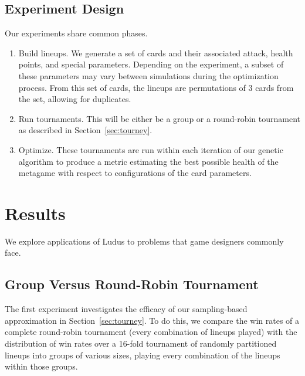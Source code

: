 \documentclass[letterpaper]{article} %
\begin{document}
\subsection{Experiment Design}


Our experiments share common phases.

\begin{enumerate}
	\item Build lineups. We generate a set of cards and their associated attack, health points, and special parameters.
	Depending on the experiment, a subset of these parameters may vary between simulations during the optimization process.
	From this set of cards, the lineups are permutations of 3 cards from the set, allowing for duplicates.
	\item Run tournaments. This will be either be a group or a round-robin tournament as described in Section~\ref{sec:tourney}.
	\item Optimize. These tournaments are run within each iteration of our genetic algorithm to produce a metric estimating the best
	possible health of the metagame with respect to configurations of the card parameters. %
\end{enumerate}

\section{Results} \label{sec:results}
We explore applications of {\sc Ludus} to problems that game designers commonly face.

\subsection{Group Versus Round-Robin Tournament}

The first experiment %
investigates the efficacy of our sampling-based approximation in Section~\ref{sec:tourney}. To do this, we compare the win rates %
of a complete round-robin tournament (every combination of lineups played) with the distribution of win rates over a 16-fold tournament of %
randomly partitioned lineups into groups of various sizes, playing every combination of the lineups within those groups.
\end{document}
